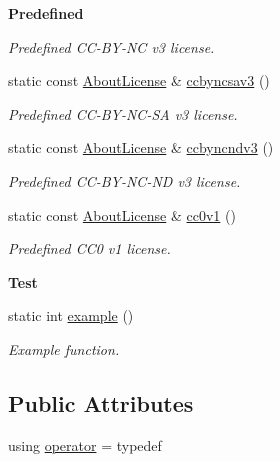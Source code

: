 \begin{Indent}{\bf Predefined}
\begin{DoxyCompactItemize}
\begin{DoxyCompactList}\small\item\em Predefined C\-C-\/\-B\-Y-\/\-N\-C v3 license. \end{DoxyCompactList}\item 
static const \hyperlink{exceptionmagrathea_1_1AboutLicense}{About\-License} \& \hyperlink{exceptionmagrathea_1_1AboutLicense_a29019fdfb220ddebe51406952323f589}{ccbyncsav3} ()
\begin{DoxyCompactList}\small\item\em Predefined C\-C-\/\-B\-Y-\/\-N\-C-\/\-S\-A v3 license. \end{DoxyCompactList}\item 
static const \hyperlink{exceptionmagrathea_1_1AboutLicense}{About\-License} \& \hyperlink{exceptionmagrathea_1_1AboutLicense_a3f90ccf1fb69e5bb8ba690c79a42bcc1}{ccbyncndv3} ()
\begin{DoxyCompactList}\small\item\em Predefined C\-C-\/\-B\-Y-\/\-N\-C-\/\-N\-D v3 license. \end{DoxyCompactList}\item 
static const \hyperlink{exceptionmagrathea_1_1AboutLicense}{About\-License} \& \hyperlink{exceptionmagrathea_1_1AboutLicense_af740a6dfc40d24b79c1d92370b207519}{cc0v1} ()
\begin{DoxyCompactList}\small\item\em Predefined C\-C0 v1 license. \end{DoxyCompactList}\end{DoxyCompactItemize}
\end{Indent}
\begin{Indent}{\bf Test}\par
\begin{DoxyCompactItemize}
\item 
static int \hyperlink{exceptionmagrathea_1_1AboutLicense_a07ffbab65dcf363b5616a3a6530058d8}{example} ()
\begin{DoxyCompactList}\small\item\em Example function. \end{DoxyCompactList}\end{DoxyCompactItemize}
\end{Indent}
\subsection*{Public Attributes}
\begin{DoxyCompactItemize}
\item 
using \hyperlink{exceptionmagrathea_1_1AboutLicense_a953ae5a3eb8a926ada61ac5bb5ab40b0}{operator} = typedef
\end{DoxyCompactItemize}

